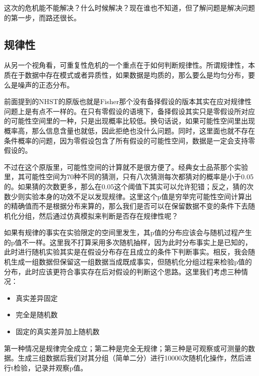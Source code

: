 \documentclass[]{tufte-book}
\providecommand{\tightlist}{%
  \setlength{\itemsep}{0pt}\setlength{\parskip}{0pt}}
\begin{document}
这次的危机能不能解决？什么时候解决？现在谁也不知道，但了解问题是解决问题的第一步，而路还很长。

\hypertarget{ux89c4ux5f8bux6027}{%
\subsection{规律性}\label{ux89c4ux5f8bux6027}}

从另一个视角看，可重复性危机的一个重点在于如何判断规律性。所谓规律性，本质在于数据中存在模式或者异质性，如果数据是均质的，那么要么是均匀分布，要么是噪声的正态分布。

前面提到的NHST的原版也就是Fisher那个没有备择假设的版本其实在应对规律性问题上是有点不一样的。在只有零假设的语境下，备择假设其实只是零假设所对应的可能性空间里的一种，只是出现概率比较低。换句话说，如果可能性空间里出现概率高，那么信息含量也就低，因此拒绝也没什么问题。同时，这里面也就不存在条件概率的问题，因为零假设包含了所有假设的可能性空间，数据是一定会支持零假设的。

不过在这个原版里，可能性空间的计算就不是很方便了。经典女士品茶那个实验里，其可能性空间为70种不同的猜测，只有八次猜测每次都猜对的概率是小于0.05的。如果猜的次数更多，那么在0.05这个阈值下其实可以允许犯错；反之，猜的次数少则实验本身的功效不足以发现规律。这里这个p值是穷举完可能性空间计算出的精确值而不是根据分布来算的，那么我们是否可以在保留数据不变的条件下去随机化分组，然后通过仿真模拟来判断是否存在规律性呢？

如果有规律的事实在实验限定的空间里发生，其p值的分布应该会与随机过程产生的p值不一样。这里我不打算采用多次随机抽样，因为此时分布事实上是已知的，此时进行随机实验其实是在假设分布存在且成立的条件下判断事实。相反，我会随机生成一组数据但保留这一组数据当成既成事实，但随机化分组过程来检验p值的分布，此时应该更符合事实存在后对假设的判断这个思路。这里我们考虑三种情况：

\begin{itemize}
\tightlist
\item
  真实差异固定
\item
  完全是随机数
\item
  固定的真实差异加上随机数
\end{itemize}

第一种情况是规律完全成立；第二种是完全无规律；第三种是可观察或可测量的数据。生成三组数据后我们对其分组（简单二分）进行10000次随机化操作，然后进行t检验，记录并观察p值。
\end{document}

